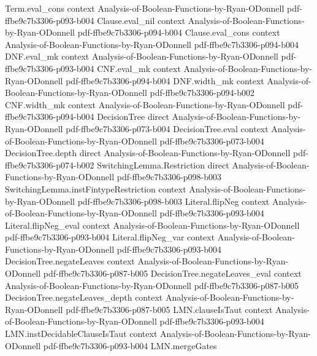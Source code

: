 \begin{theorem}
\proofstep
  {Term.eval_cons}
  {context}
  {Analysis-of-Boolean-Functions-by-Ryan-ODonnell}
  {pdf-ffbe9c7b3306-p093-b004}
\proofstep
  {Clause.eval_nil}
  {context}
  {Analysis-of-Boolean-Functions-by-Ryan-ODonnell}
  {pdf-ffbe9c7b3306-p094-b004}
\proofstep
  {Clause.eval_cons}
  {context}
  {Analysis-of-Boolean-Functions-by-Ryan-ODonnell}
  {pdf-ffbe9c7b3306-p094-b004}
\proofstep
  {DNF.eval_mk}
  {context}
  {Analysis-of-Boolean-Functions-by-Ryan-ODonnell}
  {pdf-ffbe9c7b3306-p093-b004}
\proofstep
  {CNF.eval_mk}
  {context}
  {Analysis-of-Boolean-Functions-by-Ryan-ODonnell}
  {pdf-ffbe9c7b3306-p094-b004}
\proofstep
  {DNF.width_mk}
  {context}
  {Analysis-of-Boolean-Functions-by-Ryan-ODonnell}
  {pdf-ffbe9c7b3306-p094-b002}
\proofstep
  {CNF.width_mk}
  {context}
  {Analysis-of-Boolean-Functions-by-Ryan-ODonnell}
  {pdf-ffbe9c7b3306-p094-b004}
\proofstep
  {DecisionTree}
  {direct}
  {Analysis-of-Boolean-Functions-by-Ryan-ODonnell}
  {pdf-ffbe9c7b3306-p073-b004}
\proofstep
  {DecisionTree.eval}
  {context}
  {Analysis-of-Boolean-Functions-by-Ryan-ODonnell}
  {pdf-ffbe9c7b3306-p073-b004}
\proofstep
  {DecisionTree.depth}
  {direct}
  {Analysis-of-Boolean-Functions-by-Ryan-ODonnell}
  {pdf-ffbe9c7b3306-p074-b002}
\proofstep
  {SwitchingLemma.Restriction}
  {direct}
  {Analysis-of-Boolean-Functions-by-Ryan-ODonnell}
  {pdf-ffbe9c7b3306-p098-b003}
\proofstep
  {SwitchingLemma.instFintypeRestriction}
  {context}
  {Analysis-of-Boolean-Functions-by-Ryan-ODonnell}
  {pdf-ffbe9c7b3306-p098-b003}
\proofstep
  {Literal.flipNeg}
  {context}
  {Analysis-of-Boolean-Functions-by-Ryan-ODonnell}
  {pdf-ffbe9c7b3306-p093-b004}
\proofstep
  {Literal.flipNeg_eval}
  {context}
  {Analysis-of-Boolean-Functions-by-Ryan-ODonnell}
  {pdf-ffbe9c7b3306-p093-b004}
\proofstep
  {Literal.flipNeg_var}
  {context}
  {Analysis-of-Boolean-Functions-by-Ryan-ODonnell}
  {pdf-ffbe9c7b3306-p093-b004}
\proofstep
  {DecisionTree.negateLeaves}
  {context}
  {Analysis-of-Boolean-Functions-by-Ryan-ODonnell}
  {pdf-ffbe9c7b3306-p087-b005}
\proofstep
  {DecisionTree.negateLeaves_eval}
  {context}
  {Analysis-of-Boolean-Functions-by-Ryan-ODonnell}
  {pdf-ffbe9c7b3306-p087-b005}
\proofstep
  {DecisionTree.negateLeaves_depth}
  {context}
  {Analysis-of-Boolean-Functions-by-Ryan-ODonnell}
  {pdf-ffbe9c7b3306-p087-b005}
\proofstep
  {LMN.clauseIsTaut}
  {context}
  {Analysis-of-Boolean-Functions-by-Ryan-ODonnell}
  {pdf-ffbe9c7b3306-p093-b004}
\proofstep
  {LMN.instDecidableClauseIsTaut}
  {context}
  {Analysis-of-Boolean-Functions-by-Ryan-ODonnell}
  {pdf-ffbe9c7b3306-p093-b004}
\proofstep
  {LMN.mergeGates}

\end{theorem}
